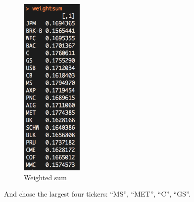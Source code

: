 \documentclass{article}
\begin{document}
\begin{figure}[h] 
\begin{center} 
\includegraphics[width = 3cm]{weightsum.png}  
\caption{Weighted sum} 
\end{center} 
\end{figure}

And chose the largest four tickers: ``MS'', ``MET'', ``C'', ``GS''.

\newpage
\end{document}
